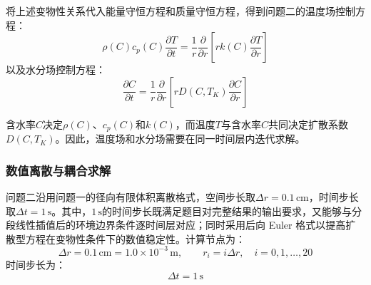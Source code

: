 \documentclass[withoutpreface,bwprint]{cumcmthesis}
\begin{document}
将上述变物性关系代入能量守恒方程和质量守恒方程，得到问题二的温度场控制方程：
\begin{equation}
\boxed{
\rho(C)c_p(C)\frac{\partial T}{\partial t}
=
\frac{1}{r}
\frac{\partial}{\partial r}
\left[
rk(C)\frac{\partial T}{\partial r}
\right]
}
\label{eq:q2-variable-heat}
\end{equation}
以及水分场控制方程：
\begin{equation}
\boxed{
\frac{\partial C}{\partial t}
=
\frac{1}{r}
\frac{\partial}{\partial r}
\left[
rD(C,T_K)\frac{\partial C}{\partial r}
\right]
}
\label{eq:q2-variable-moisture}
\end{equation}

含水率$C$决定$\rho(C)$、$c_p(C)$和$k(C)$，而温度$T$与含水率$C$共同决定扩散系数$D(C,T_K)$。因此，温度场和水分场需要在同一时间层内迭代求解。

\subsubsection{数值离散与耦合求解}

问题二沿用问题一的径向有限体积离散格式，空间步长取$\Delta r=0.1\,\mathrm{cm}$，时间步长取$\Delta t=1\,\mathrm{s}$。其中，$1\,\mathrm{s}$的时间步长既满足题目对完整结果的输出要求，又能够与分段线性插值后的环境边界条件逐时间层对应；同时采用后向 Euler 格式以提高扩散型方程在变物性条件下的数值稳定性。计算节点为：
\begin{equation}
\Delta r=0.1\,\mathrm{cm}=1.0\times10^{-3}\,\mathrm{m},
\qquad
r_i=i\Delta r,\quad i=0,1,\ldots,20
\label{eq:q2-space-grid}
\end{equation}
时间步长为：
\begin{equation}
\Delta t=1\,\mathrm{s}
\label{eq:q2-time-grid}
\end{equation}
\end{document}
